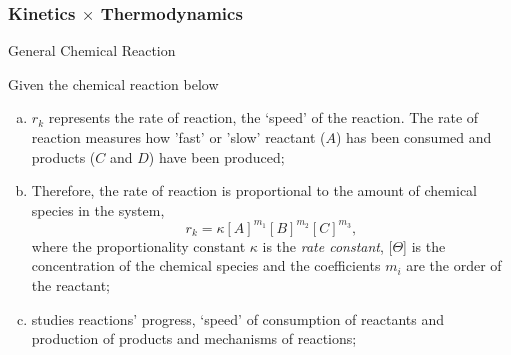 \documentclass[10pt,compress,unknownkeysallowed]{beamer}
\begin{document}
\begin{frame}
  \frametitle{Kinetics $\times$ Thermodynamics}

  \begin{block}{\begin{center}General Chemical Reaction\end{center}}
     Given the chemical reaction below
  \end{block}  

   \begin{enumerate}[a)]
       \item<1-> $r_{k}$ represents the rate of reaction, \ie the `speed' of the reaction. The rate of reaction measures how 'fast' or 'slow' reactant ($A$) has been consumed and products ($C$ and $D$) have been produced;
       \item<1-> Therefore, the rate of reaction is proportional to the amount of chemical species in the system, \eg
             \begin{displaymath}
                  r_{k} = \kappa [A]^{m_{1}}[B]^{m_{2}}[C]^{m_{3}},
             \end{displaymath}
             where the proportionality constant $\kappa$ is the {\it rate constant}, [$\Theta$] is the concentration of the chemical species and the coefficients $m_{i}$ are the order of the reactant;
       \item<1->  studies reactions' progress, \ie `speed' of consumption of reactants and production of products and mechanisms of reactions;
   \end{enumerate}
\end{frame}
\normalsize
\end{document}
